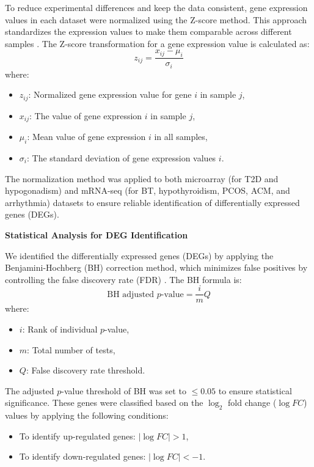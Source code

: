 To reduce experimental differences and keep the data consistent, gene expression values in each dataset were normalized using the Z-score method. This approach standardizes the expression values to make them comparable across different samples \cite{b3}. The Z-score transformation for a gene expression value is calculated as:
\begin{equation}
z_{ij} = \frac{x_{ij} - \mu_i}{\sigma_i}
\label{eq:zscore}
\end{equation}
where:
\begin{itemize}
    \item $z_{ij}$: Normalized gene expression value for gene $i$ in sample $j$,
    \item $x_{ij}$: The value of gene expression $i$ in sample $j$,
    \item $\mu_i$: Mean value of gene expression $i$ in all samples,
    \item $\sigma_i$: The standard deviation of gene expression values $i$.
\end{itemize}

The normalization method was applied to both microarray (for T2D and hypogonadism) and mRNA-seq (for BT, hypothyroidism, PCOS, ACM, and arrhythmia) datasets to ensure reliable identification of differentially expressed genes (DEGs).

\vspace{8mm}
\textbf{Statistical Analysis for DEG Identification}
\vspace{5mm}

We identified the differentially expressed genes (DEGs) by applying the Benjamini-Hochberg (BH) correction method, which minimizes false positives by controlling the false discovery rate (FDR) \cite{b10}. The BH formula is:
\begin{equation}
\text{BH adjusted } p\text{-value} = \frac{i}{m} Q
\label{eq:bh_formula}
\end{equation}
where:
\begin{itemize}
    \item $i$: Rank of individual $p$-value,
    \item $m$: Total number of tests,
    \item $Q$: False discovery rate threshold.
\end{itemize}

The adjusted $p$-value threshold of BH was set to $\leq 0.05$ to ensure statistical significance. These genes were classified based on the $\log_2$ fold change ($\log FC$) values by applying the following conditions:
\begin{itemize}
    \item To identify up-regulated genes: $\left| \log FC \right| > 1$,
    \item To identify down-regulated genes: $\left| \log FC \right| < -1$.
\end{itemize}

